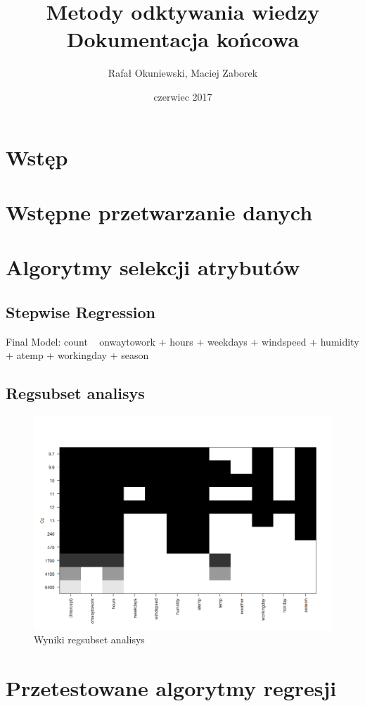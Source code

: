 \documentclass[a4paper,12pt]{article}
\title{Metody odktywania wiedzy\\\Large{Dokumentacja końcowa}}
\author{Rafał Okuniewski, Maciej Zaborek}
\date{czerwiec 2017}
\begin{document}
\maketitle

\section{Wstęp}
\section{Wstępne przetwarzanie danych}
\section{Algorytmy selekcji atrybutów}
	\subsection{Stepwise Regression}
		Final Model:
count ~ onwaytowork + hours + weekdays + windspeed + humidity + 
    atemp + workingday + season
	\subsection{Regsubset analisys}
		\begin{figure}[h]
   			\centering
    		\includegraphics[width=\linewidth]{regsubsetanalysis}
		    \caption{Wyniki regsubset analisys}
    		\label{fig:my_label}
		\end{figure}
\section{Przetestowane algorytmy regresji}
\end{document}
